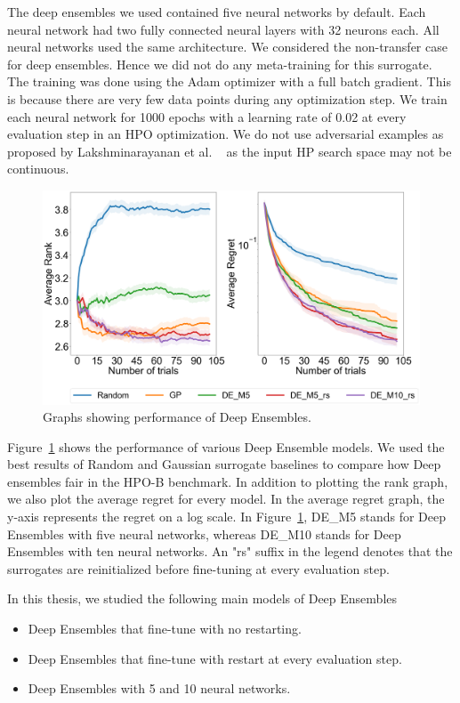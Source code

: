 \documentclass[12pt, twoside, ngerman]{report}
\begin{document}
The deep ensembles we used contained five neural networks by default. Each neural network had two fully connected neural layers with 32 neurons each. All neural networks used the same architecture. 
We considered the non-transfer case for deep ensembles. Hence we did not do any meta-training for this surrogate.
The training was done using the Adam optimizer with a full batch gradient. This is because there are very few data points during any optimization step. We train each neural network for 1000 epochs with a learning rate of 0.02 at every evaluation step in an HPO optimization.
We do not use adversarial examples as proposed by Lakshminarayanan
 et al. ~\cite{DeepEnsemblePaper} as the input HP search space may not be continuous.

\begin{figure}[h]
  \centering
    \includegraphics[scale=0.25]{images/DEPerformance}
    \caption{Graphs showing performance of Deep Ensembles.}
    \label{fig:DEPerformance}
\end{figure}

Figure~\ref{fig:DEPerformance} shows the performance of various Deep Ensemble models.
We used the best results of Random and Gaussian surrogate baselines to compare how Deep ensembles fair in the HPO-B benchmark.
In addition to plotting the rank graph,  we also plot the average regret for every model.
In the average regret graph, the y-axis represents the regret on a log scale.
In Figure~\ref{fig:DEPerformance},  DE\_M5 stands for Deep Ensembles with five neural networks, whereas DE\_M10 stands for Deep Ensembles with ten neural networks.
An "rs" suffix in the legend denotes that the surrogates are reinitialized before fine-tuning at every evaluation step.

In this thesis, we studied the following main models of Deep Ensembles
\begin{itemize}
\item Deep Ensembles that fine-tune with no restarting.
\item Deep Ensembles that fine-tune with restart at every evaluation step.
\item Deep Ensembles with 5 and 10 neural networks.
\end{itemize}
\end{document}
